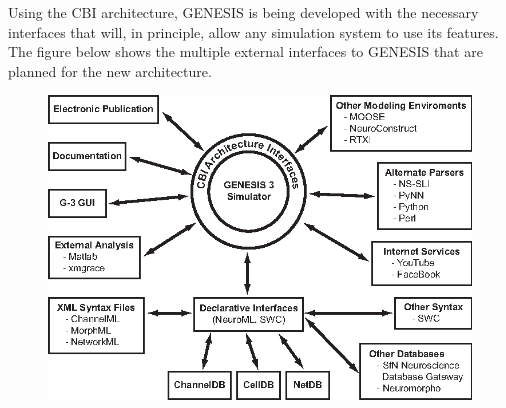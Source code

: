 \documentclass[12pt]{article}
\begin{document}
Using the CBI architecture, GENESIS is being developed with the necessary interfaces that will, in principle, allow any simulation system to use its features. The figure below shows the multiple external interfaces to GENESIS that are planned for the new architecture.

\begin{figure}[h]
  \centering
 \includegraphics[scale=1.25]{figures/G3-Interfaces.eps}
  \label{fig:g3interfaces}
\end{figure}
\end{document}
